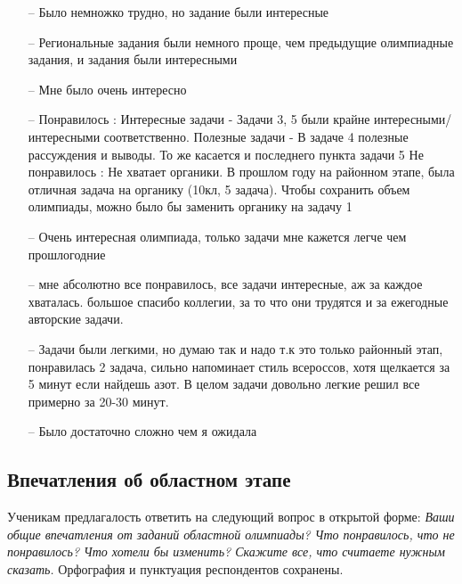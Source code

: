 \begin{itemize}
    \item[--] Было немножко трудно, но задание были интересные
    \item[--] Региональные задания были немного проще, чем предыдущие олимпиадные задания, и задания были интересными
    \item[--] Мне было очень интересно
    \item[--] Понравилось : Интересные задачи - Задачи 3, 5 были крайне интересными/интересными соответственно. Полезные задачи - В задаче 4 полезные рассуждения и выводы. То же касается и последнего пункта задачи 5 Не понравилось : Не хватает органики. В прошлом году на районном этапе, была отличная задача на органику (10кл, 5 задача). Чтобы сохранить объем олимпиады, можно было бы заменить органику на задачу 1
    \item[--] Очень интересная олимпиада, только задачи мне кажется легче чем прошлогодние
    \item[--] мне абсолютно все понравилось, все задачи интересные, аж за каждое хваталась. большое спасибо коллегии, за то что они трудятся и за ежегодные авторские задачи.
    \item[--] Задачи были легкими, но думаю так и надо т.к это только районный этап, понравилась 2 задача, сильно напоминает стиль всероссов, хотя щелкается за 5 минут если найдешь азот. В целом задачи довольно легкие решил все примерно за 20-30 минут.
    \item[--] Было достаточно сложно чем я ожидала
\end{itemize}

\subsection{Впечатления об областном этапе}
Ученикам предлагалость ответить на следующий вопрос в открытой форме: \textit{Ваши общие впечатления от заданий областной олимпиады? Что понравилось, что не понравилось? Что хотели бы изменить? Скажите все, что считаете нужным сказать.} Орфография и пунктуация респондентов сохранены.

